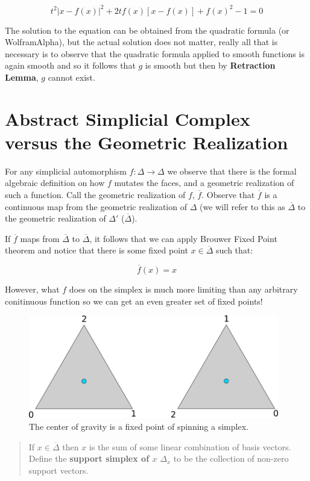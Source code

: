 \documentclass[a4paper]{article}
\newcommand{\ol}{\overline}
\begin{document}
$$t^2|x - f(x)|^2 + 2tf(x)[x - f(x)] + f(x)^2 - 1 = 0$$

The solution to the equation can be obtained from the quadratic formula (or WolframAlpha), but the actual solution does not matter, really all that is necessary is to observe that the quadratic formula applied to smooth functions is again smooth and so it follows that $g$ is smooth but then by \textbf{Retraction Lemma}, $g$ cannot exist.

\section{Abstract Simplicial Complex versus the Geometric Realization}

For any simplicial automorphism $f : \Delta \to \Delta$ we observe that there is the formal algebraic definition on how $f$ mutates the faces, and a geometric realization of such a function. Call the geometric realization of $f$, $\ol{f}$. Observe that $\ol{f}$ is a continuous map from the geometric realization of $\Delta$ (we will refer to this as $\ol{\Delta}$ to the geometric realization of $\Delta'$ ($\ol{\Delta}$).

If $\ol{f}$ maps from $\ol{\Delta}$ to $\ol{\Delta}$, it follows that we can apply Brouwer Fixed Point theorem and notice that there is some fixed point $x \in \ol{\Delta}$ such that:

$$\ol{f}(x) = x$$

However, what $f$ does on the simplex is much more limiting than any arbitrary conitinuous function so we can get an even greater set of fixed points!

\begin{figure}
    \includegraphics[height=4.5cm]{rotate}
    \centering
    \caption{The center of gravity is a fixed point of spinning a simplex.}
\end{figure}

\begin{quote}
    If $x \in \ol{\Delta}$ then $x$ is the sum of some linear combination of basis vectors. Define the \textbf{support simplex of $x$} $\Delta_x$ to be the collection of non-zero support vectors.
\end{quote}
\end{document}
